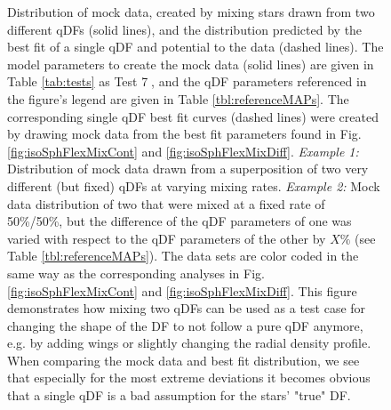 \begin{figure}
\caption{Distribution of mock data, created by mixing stars drawn from two different qDFs (solid lines), and the distribution predicted by the best fit of a single qDF and potential to the data (dashed lines). The model parameters to create the mock data (solid lines) are given in Table \ref{tab:tests} as Test \textcircled{7}, and the qDF parameters referenced in the figure's legend are given in Table \ref{tbl:referenceMAPs}. The corresponding single qDF best fit curves (dashed lines) were created by drawing mock data from the best fit parameters found in Fig. \ref{fig:isoSphFlexMixCont} and \ref{fig:isoSphFlexMixDiff}. \emph{Example 1:} Distribution of mock data drawn from a superposition of two very different (but fixed) qDFs at varying mixing rates. \emph{Example 2:} Mock data distribution of two \MAPs that were mixed at a fixed rate of 50\%/50\%, but the difference of the qDF parameters of one \MAP was varied with respect to the qDF parameters of the other \MAP by $X\%$ (see Table \ref{tbl:referenceMAPs}). The data sets are color coded in the same way as the corresponding analyses in Fig.  \ref{fig:isoSphFlexMixCont} and \ref{fig:isoSphFlexMixDiff}. This figure demonstrates how mixing two qDFs can be used as a test case for changing the shape of the DF to not follow a pure qDF anymore, e.g. by adding wings or slightly changing the radial density profile. When comparing the mock data and best fit distribution, we see that especially for the most extreme deviations it becomes obvious that a single qDF is a bad assumption for the stars' "true" DF.}
\label{fig:isoSphFlexMix_mockdata_residuals}
\end{figure}



